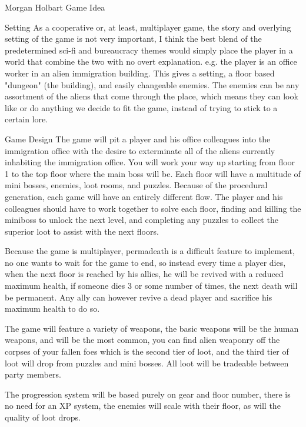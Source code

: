 \documentclass[12pt]{report}
\begin{document}
\begin{section}{Morgan Holbart Game Idea}
\begin{subsection}{Setting}
As a cooperative or, at least, multiplayer game, the story and overlying
setting of the game is not very important, I think the best blend of the
predetermined sci-fi and bureaucracy themes would simply place the player
in a world that combine the two with no overt explanation. e.g. the player
is an office worker in an alien immigration building.
This gives a setting, a floor based "dungeon" (the building), and easily
changeable enemies. The enemies can be any assortment of the aliens that
come through the place, which means they can look like or do anything we
decide to fit the game, instead of trying to stick to a certain lore.
\end{subsection}

\begin{subsection}{Game Design}
The game will pit a player and his office colleagues into the immigration
office with the desire to exterminate all of the aliens currently inhabiting
the immigration office. You will work your way up starting from floor 1 to
the top floor where the main boss will be. Each floor will have a multitude
of mini bosses, enemies, loot rooms, and puzzles. Because of the procedural
generation, each game will have an entirely different flow. The player and
his colleagues should have to work together to solve each floor, finding and
killing the miniboss to unlock the next level, and completing any puzzles
to collect the superior loot to assist with the next floors.

Because the game is multiplayer, permadeath is a difficult feature to
implement, no one wants to wait for the game to end, so instead every time a
player dies, when the next floor is reached by his allies, he will be
revived with a reduced maximum health, if someone dies 3 or some number of
times, the next death will be permanent. Any ally can however revive a dead
player and sacrifice his maximum health to do so.

The game will feature a variety of weapons, the basic weapons will be the
human weapons, and will be the most common, you can find alien weaponry off
the corpses of your fallen foes which is the second tier of loot, and the
third tier of loot will drop from puzzles and mini bosses. All loot will be
tradeable between party members.

The progression system will be based purely on gear and floor number, there
is no need for an XP system, the enemies will scale with their floor, as
will the quality of loot drops.
\end{subsection}


\end{section}
\end{document}
